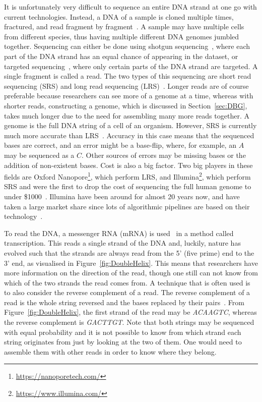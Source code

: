 It is unfortunately very difficult to sequence an entire DNA strand at one go with current technologies.
Instead, a DNA of a sample is cloned multiple times, fractured, and read fragment by fragment~\cite{ShotgunSequencing}.
A sample may have multiple cells from different species, thus having multiple different DNA genomes jumbled together.
Sequencing can either be done using shotgun sequencing~\cite{ShotgunSequencingOriginal}, where each part of the DNA strand has an equal chance of appearing in the dataset, or targeted sequencing~\cite{TargetedSequencing}, where only certain parts of the DNA strand are targeted.
A single fragment is called a read.
The two types of this sequencing are short read sequencing (SRS) and long read sequencing (LRS)~\cite{SrsVsLrs}.
Longer reads are of course preferable because researchers can see more of a genome at a time, whereas with shorter reads, constructing a genome, which is discussed in Section~\ref{sec:DBG}, takes much longer due to the need for assembling many more reads together.
A genome is the full DNA string of a cell of an organism.
However, SRS is currently much more accurate than LRS~\cite{LrsChallenges}.
Accuracy in this case means that the sequenced bases are correct, and an error might be a base-flip, where, for example, an $A$ may be sequenced as a $C$.
Other sources of errors may be missing bases or the addition of non-existent bases.
Cost is also a big factor.
Two big players in these fields are Oxford Nanopore\footnote{\url{https://nanoporetech.com/}}, which perform LRS, and Illumina\footnote{\url{https://www.illumina.com/}}, which perform SRS and were the first to drop the cost of sequencing the full human genome to under \$1000~\cite{LrsChallenges}.
Illumina have been around for almost 20 years now, and have taken a large market share since lots of algorithmic pipelines are based on their technology~\cite{SrsVsLrs}.

To read the DNA, a messenger RNA (mRNA) is used~\cite{mrna} in a method called transcription.
This reads a single strand of the DNA and, luckily, nature has evolved such that the strands are always read from the 5' (five prime) end to the 3' end, as visualised in Figure~\ref{fig:DoubleHelix}.
This means that researchers have more information on the direction of the read, though one still can not know from which of the two strands the read comes from.
A technique that is often used is to also consider the reverse complement of a read.
The reverse complement of a read is the whole string reversed and the bases replaced by their pairs~\cite{ReverseComplements}.
From Figure~\ref{fig:DoubleHelix}, the first strand of the read may be \textit{ACAAGTC}, whereas the reverse complement is \textit{GACTTGT}.\@
Note that both strings may be sequenced with equal probability and it is not possible to know from which strand each string originates from just by looking at the two of them.
One would need to assemble them with other reads in order to know where they belong.

